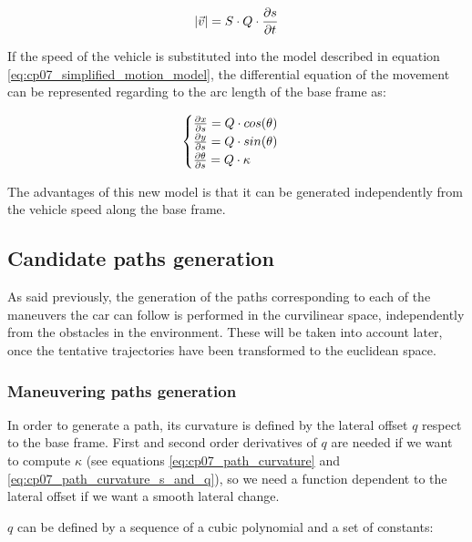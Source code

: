 \begin{equation}\label{eq:cp07_speed_to_distance}
|\vec{v}| = S \cdot Q \cdot { {\partial s} \over {\partial t}}
\end{equation}

If the speed of the vehicle is substituted into the model described in equation \ref{eq:cp07_simplified_motion_model}, the differential equation of the movement can be represented regarding to the arc length of the base frame as:

\begin{equation}\label{eq:cp07_motion_model_in_distance_terms}
\begin{cases}
{{\partial x} \over {\partial s}} = Q \cdot cos(\theta) \\
{{\partial y} \over {\partial s}} = Q \cdot sin(\theta) \\
{{\partial \theta} \over {\partial s}} = Q \cdot \kappa
\end{cases}
\end{equation}

The advantages of this new model is that it can be generated independently from the vehicle speed along the base frame.

\subsection{Candidate paths generation}\label{ch:chapter07_01_03}

As said previously, the generation of the paths corresponding to each of the maneuvers the car can follow is performed in the curvilinear space, independently from the obstacles in the environment. These will be taken into account later, once the tentative trajectories have been transformed to the euclidean space.

\subsubsection{Maneuvering paths generation}\label{ch:chapter07_01_03_01}

In order to generate a path, its curvature is defined by the lateral offset $q$ respect to the base frame. First and second order derivatives of $q$ are needed if we want to compute $\kappa$ (see equations \ref{eq:cp07_path_curvature} and \ref{eq:cp07_path_curvature_s_and_q}), so we need a function dependent to the lateral offset if we want a smooth lateral change.

$q$ can be defined by a sequence of a cubic polynomial and a set of constants:

